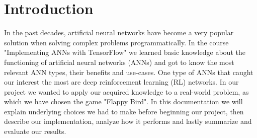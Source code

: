 \section{Introduction}
In the past decades, artificial neural networks have become a very popular solution when solving complex problems programmatically. In the course "Implementing ANNs with TensorFlow" we learned basic knowledge about the functioning of artificial neural networks (ANNs) and got to know the most relevant ANN types, their benefits and use-cases. One type of ANNs that caught our interest the most are deep reinforcement learning (RL) networks. In our project we wanted to apply our acquired knowledge to a real-world problem, as which we have chosen the game "Flappy Bird". In this documentation we will explain underlying choices we had to make before beginning our project, then describe our implementation, analyze how it performs and lastly summarize and evaluate our results.